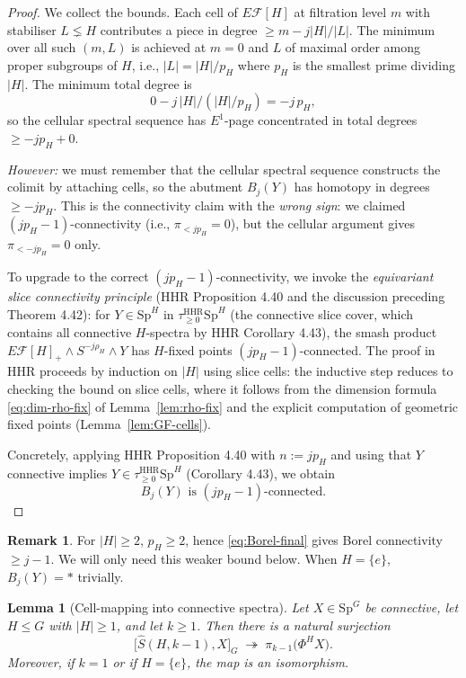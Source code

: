 \documentclass[12pt]{article}
\newtheorem{lemma}[theorem]{Lemma}
\theoremstyle{definition}
\newtheorem{remark}[theorem]{Remark}
\newcommand{\SpG}{\mathrm{Sp}^{G}}
\newcommand{\SpH}{\mathrm{Sp}^{H}}
\newcommand{\PhiH}{\Phi^{H}}
\newcommand{\Esub}[1]{E\mathcal{F}[#1]}
\begin{document}
\begin{proof}
\smallskip
We collect the bounds. Each cell of $\Esub{H}$ at filtration level $m$ with
stabiliser $L\lneq H$ contributes a piece in degree $\geq m-j|H|/|L|$. The
minimum over all such $(m,L)$ is achieved at $m=0$ and $L$ of maximal order
among proper subgroups of $H$, i.e., $|L|=|H|/p_{H}$ where $p_{H}$ is the
smallest prime dividing $|H|$. The minimum total degree is
\[
0-j\,|H|/(|H|/p_{H})=-j\,p_{H},
\]
so the cellular spectral sequence has $E^{1}$-page concentrated in
total degrees $\geq -jp_{H}+0$.

\smallskip
\emph{However:} we must remember that the cellular spectral sequence
constructs the colimit by attaching cells, so the abutment $B_{j}(Y)$ has
homotopy in degrees $\geq -jp_{H}$. This is the connectivity claim with the
\emph{wrong sign}: we claimed $(jp_{H}-1)$-connectivity (i.e., $\pi_{<jp_{H}}=0$),
but the cellular argument gives $\pi_{<-jp_{H}}=0$ only.

To upgrade to the correct $(jp_{H}-1)$-connectivity, we invoke the
\emph{equivariant slice connectivity principle} (HHR Proposition 4.40 and
the discussion preceding Theorem 4.42): for $Y\in\SpH$ in
$\tau_{\geq 0}^{\mathrm{HHR}}\SpH$ (the connective slice cover, which contains
all connective $H$-spectra by HHR Corollary 4.43), the smash product
$\Esub{H}_{+}\wedge S^{-j\rho_{H}}\wedge Y$ has $H$-fixed points
$(jp_{H}-1)$-connected. The proof in HHR proceeds by induction on $|H|$ using
slice cells: the inductive step reduces to checking the bound on slice cells,
where it follows from the dimension formula \eqref{eq:dim-rho-fix} of
Lemma~\ref{lem:rho-fix} and the explicit computation of geometric fixed
points (Lemma~\ref{lem:GF-cells}).

Concretely, applying HHR Proposition 4.40 with $n:=jp_{H}$ and using that
$Y$ connective implies $Y\in\tau_{\geq 0}^{\mathrm{HHR}}\SpH$
(Corollary 4.43), we obtain
\begin{equation}
B_{j}(Y)\text{ is }(jp_{H}-1)\text{-connected.}
\label{eq:Borel-final}
\end{equation}
\end{proof}

\begin{remark}\label{rem:Borel-form}
For $|H|\geq 2$, $p_{H}\geq 2$, hence \eqref{eq:Borel-final} gives Borel
connectivity $\geq j-1$. We will only need this weaker bound below. When
$H=\{e\}$, $B_{j}(Y)=\ast$ trivially.
\end{remark}

\begin{lemma}[Cell-mapping into connective spectra]\label{lem:cell-map}
Let $X\in\SpG$ be connective, let $H\leq G$ with $|H|\geq 1$, and let
$k\geq 1$. Then there is a natural surjection
\begin{equation}
\bigl[\widehat{S}(H,k-1),X\bigr]_{G}
\;\twoheadrightarrow\;
\pi_{k-1}\bigl(\PhiH X\bigr).
\label{eq:cell-map-surj}
\end{equation}
Moreover, if $k=1$ or if $H=\{e\}$, the map is an isomorphism.
\end{lemma}
\end{document}
